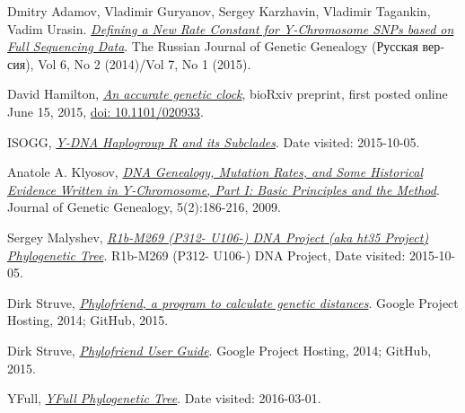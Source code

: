 \raggedright
\begin{thebibliography}{bla}

 Dmitry Adamov, Vladimir Guryanov,
Sergey Karzhavin, Vladimir Tagankin, Vadim Urasin.
\emph{\href{http://rjgg.molgen.org/index.php/RJGGRE/article/view/151}
{Defining a New Rate Constant for Y-Chromosome SNPs based on Full Sequencing Data}}.
The Russian Journal of Genetic Genealogy
(\foreignlanguage{russian}{Русская версия}),
Vol 6, No 2 (2014)/Vol 7, No 1 (2015).

 David Hamilton,
\emph{\href{http://biorxiv.org/content/early/2015/06/19/020933}
{An accurate genetic clock}},
bioRxiv preprint, first posted online June 15, 2015,
\href{http://dx.doi.org/10.1101/020933}{doi: 10.1101/020933}.

 ISOGG,
\emph{\href{http://www.isogg.org/tree/ISOGG_HapgrpR.html}
{Y-DNA Haplogroup R and its Subclades}}.
Date visited: 2015-10-05.

 Anatole A. Klyosov,
\emph{\href{http://www.jogg.info/52/files/Klyosov1.pdf}
{DNA Genealogy, Mutation Rates, and Some Historical
Evidence Written in Y-Chromosome, Part I:  Basic Principles and
the Method}}.
Journal of Genetic Genealogy, 5(2):186-216, 2009.

 Sergey Malyshev,
\emph{\href{https://www.familytreedna.com/groups/ht-3-5new/about/results}
{R1b-M269 (P312- U106-) DNA Project (aka ht35 Project) Phylogenetic Tree}}.
R1b-M269 (P312- U106-) DNA Project, Date visited: 2015-10-05.

 Dirk Struve,
\emph{\href{https://github.com/yogischogi/phylofriend/}{Phylofriend,
a program to calculate genetic distances}}.
Google Project Hosting, 2014; GitHub, 2015.

 Dirk Struve,
\emph{\href{https://github.com/yogischogi/phylofriend/blob/master/doc/phylofriend.pdf?raw=true}
{Phylofriend User Guide}}.
Google Project Hosting, 2014; GitHub, 2015.

 YFull,
\emph{\href{http://yfull.com/tree/}{YFull Phylogenetic Tree}}.
Date visited: 2016-03-01.

\end{thebibliography}
